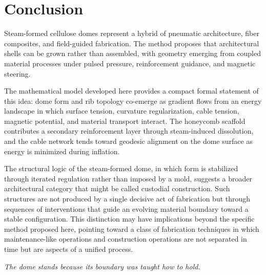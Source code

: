 \documentclass[12pt,a4paper]{article}
\begin{document}
\section{Conclusion}

Steam-formed cellulose domes represent a hybrid of pneumatic
architecture, fiber composites, and field-guided fabrication. The
method proposes that architectural shells can be grown rather than
assembled, with geometry emerging from coupled material processes under
pulsed pressure, reinforcement guidance, and magnetic steering.

The mathematical model developed here provides a compact formal
statement of this idea: dome form and rib topology co-emerge as
gradient flows from an energy landscape in which surface tension,
curvature regularization, cable tension, magnetic potential, and
material transport interact. The honeycomb scaffold contributes a
secondary reinforcement layer through steam-induced dissolution, and
the cable network tends toward geodesic alignment on the dome surface
as energy is minimized during inflation.

The structural logic of the steam-formed dome, in which form is
stabilized through iterated regulation rather than imposed by a mold,
suggests a broader architectural category that might be called custodial
construction. Such structures are not produced by a single decisive act
of fabrication but through sequences of interventions that guide an
evolving material boundary toward a stable configuration. This
distinction may have implications beyond the specific method proposed
here, pointing toward a class of fabrication techniques in which
maintenance-like operations and construction operations are not
separated in time but are aspects of a unified process.

\bigskip

\begin{center}
\textit{The dome stands because its boundary was taught how to hold.}
\end{center}
\end{document}
